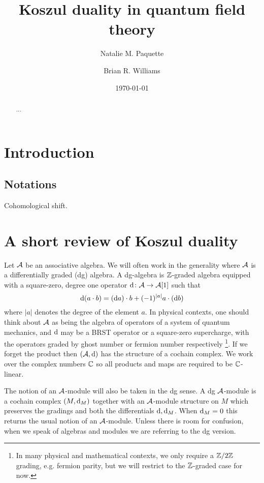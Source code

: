\documentclass[11pt]{amsart}
\author{Natalie M. Paquette}
\author{Brian R. Williams}
\date{\today}
\title{Koszul duality in quantum field theory}
\begin{document}
\maketitle

\begin{abstract}
...
\end{abstract}


\section{Introduction}

\subsection*{Notations}

Cohomological shift. 



\section{A short review of Koszul duality} 


Let $\mathcal A$ be an associative algebra.
We will often work in the generality where $\mathcal A$ is a differentially graded (dg) algebra. A dg-algebra is $\mathbb Z$-graded algebra equipped with a square-zero, degree one operator ${\rm d} \colon \mathcal A \to \mathcal A[1]$ such that 
\[
{\rm d} (a \cdot b) = ({\rm d} a) \cdot b + (-1)^{|a|} a \cdot ({\rm d} b) 
\]
where $|a|$ denotes the degree of the element $a$. In physical contexts, one should think about $\mathcal A$ as being the algebra of operators of a system of quantum mechanics, and ${\rm d}$ may be a BRST operator or a square-zero supercharge, with the operators graded by ghost number or fermion number respectively \footnote{In many physical and mathematical contexts, we only require a $\mathbb Z/2\mathbb Z$ grading, e.g. fermion parity, but we will restrict to the $\mathbb Z$-graded case for now.}.
If we forget the product then $(\mathcal A, {\rm d})$ has the structure of a cochain complex. 
We work over the complex numbers $\mathbb C$ so all products and maps are required to be $\mathbb C$-linear. 

The notion of an $\mathcal A$-module will also be taken in the dg sense. A dg $\mathcal A$-module is a cochain complex $(M, {\rm d}_M)$ together with an $\mathcal A$-module structure on $M$ which preserves the gradings and both the differentials ${\rm d}, {\rm d}_M$. 
When ${\rm d}_M = 0$ this returns the usual notion of an $\mathcal A$-module. 
Unless there is room for confusion, when we speak of algebras and modules we are referring to the dg version.
\end{document}
